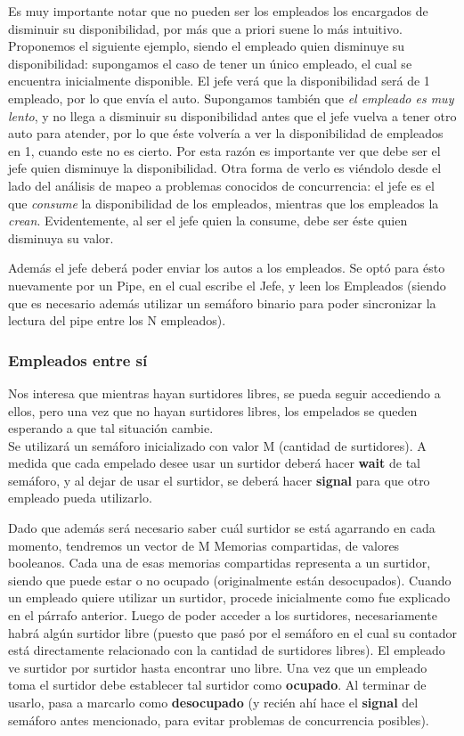 \documentclass[a4paper,12pt]{article}
\begin{document}
Es muy importante notar que no pueden ser los empleados los encargados de disminuir su disponibilidad, por más que a priori suene lo más intuitivo. Proponemos el siguiente ejemplo, siendo el empleado quien disminuye su disponibilidad: supongamos el caso de tener un único empleado, el cual se encuentra inicialmente disponible. El jefe verá que la disponibilidad será de 1 empleado, por lo que envía el auto. Supongamos también que \textit{el empleado es muy lento}, y no llega a disminuir su disponibilidad antes que el jefe vuelva a tener otro auto para atender, por lo que éste volvería a ver la disponibilidad de empleados en 1, cuando este no es cierto. Por esta razón es importante ver que debe ser el jefe quien disminuye la disponibilidad. Otra forma de verlo es viéndolo desde el lado del análisis de mapeo a problemas conocidos de concurrencia: el jefe es el que \textit{consume} la disponibilidad de los empleados, mientras que los empleados la \textit{crean}. Evidentemente, al ser el jefe quien la consume, debe ser éste quien disminuya su valor.

Además el jefe deberá poder enviar los autos a los empleados. Se optó para ésto nuevamente por un Pipe, en el cual escribe el Jefe, y leen los Empleados (siendo que es necesario además utilizar un semáforo binario para poder sincronizar la lectura del pipe entre los N empleados).

\subsubsection{Empleados entre sí}
Nos interesa que mientras hayan surtidores libres, se pueda seguir accediendo a ellos, pero una vez que no hayan surtidores libres, los empelados se queden esperando a que tal situación cambie.\\
Se utilizará un semáforo inicializado con valor M (cantidad de surtidores). A medida que cada empelado desee usar un surtidor deberá hacer \textbf{wait} de tal semáforo, y al dejar de usar el surtidor, se deberá hacer \textbf{signal} para que otro empleado pueda utilizarlo.

Dado que además será necesario saber cuál surtidor se está agarrando en cada momento, tendremos un vector de M Memorias compartidas, de valores booleanos. Cada una de esas memorias compartidas representa a un surtidor, siendo que puede estar o no ocupado (originalmente están desocupados). Cuando un empleado quiere utilizar un surtidor, procede inicialmente como fue explicado en el párrafo anterior. Luego de poder acceder a los surtidores, necesariamente habrá algún surtidor libre (puesto que pasó por el semáforo en el cual su contador está directamente relacionado con la cantidad de surtidores libres). El empleado ve surtidor por surtidor hasta encontrar uno libre. Una vez que un empleado toma el surtidor debe establecer tal surtidor como \textbf{ocupado}. Al terminar de usarlo, pasa a marcarlo como \textbf{desocupado} (y recién ahí hace el \textbf{signal} del semáforo antes mencionado, para evitar problemas de concurrencia posibles).
\end{document}
